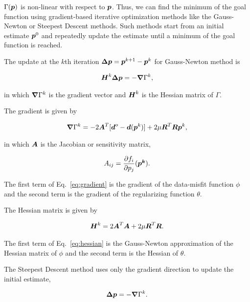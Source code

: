 \documentclass[extra]{gji}
\newcommand{\eq}[1]{Eq.~\ref{eq:#1}}
\newcommand{\mbf}[1]{\hbox{\mathversion{bold}$#1$}}
\begin{document}
\noindent $\Gamma(\mbf{p})$ is non-linear with respect to $\mbf{p}$.
Thus, we can find the minimum of the goal function using gradient-based
iterative optimization
methods like the Gauss-Newton or Steepest Descent methods.
Such methods start from an initial estimate $\mbf{p}^0$ and repeatedly update
the estimate until a minimum of the goal function is reached.

The update at the $k$th iteration $\mbf{\Delta p} = \mbf{p}^{k+1} - \mbf{p}^k$
for Gauss-Newton method is

\begin{equation}
    \mbf{H}^k\mbf{\Delta p} = -\mbf{\nabla}\Gamma^k,
    \label{eq:gaussnewton}
\end{equation}

\noindent in which
$\mbf{\nabla}\Gamma^k$ is the gradient vector and
$\mbf{H}^k$ is the Hessian matrix of $\Gamma$.

The gradient is given by

\begin{equation}
    \mbf{\nabla}\Gamma^k =
    -2\mbf{A}^T[\mbf{d}^o - \mbf{d}(\mbf{p}^k)] +
    2\mu\mbf{R}^T\mbf{R}\mbf{p}^k,
    \label{eq:gradient}
\end{equation}

\noindent in which
$\mbf{A}$ is the Jacobian or sensitivity matrix,

\begin{equation}
    A_{ij} = \dfrac{\partial f_i}{\partial p_j}(\mbf{p^k}).
    \label{eq:jacobian}
\end{equation}

\noindent
The first term of \eq{gradient} is the gradient of the data-misfit
function $\phi$ and the second term is the gradient of the regularizing
function $\theta$.

The Hessian matrix is given by

\begin{equation}
    \mbf{H}^k = 2\mbf{A}^T\mbf{A} +
    2\mu\mbf{R}^T\mbf{R}.
    \label{eq:hessian}
\end{equation}

\noindent
The first term of \eq{hessian} is the Gauss-Newton approximation of the Hessian
matrix of $\phi$ and the second term is the Hessian of $\theta$.

The Steepest Descent method uses only the gradient direction to
update the initial estimate,

\begin{equation}
    \mbf{\Delta p} = -\mbf{\nabla}\Gamma^k.
\end{equation}
\end{document}
